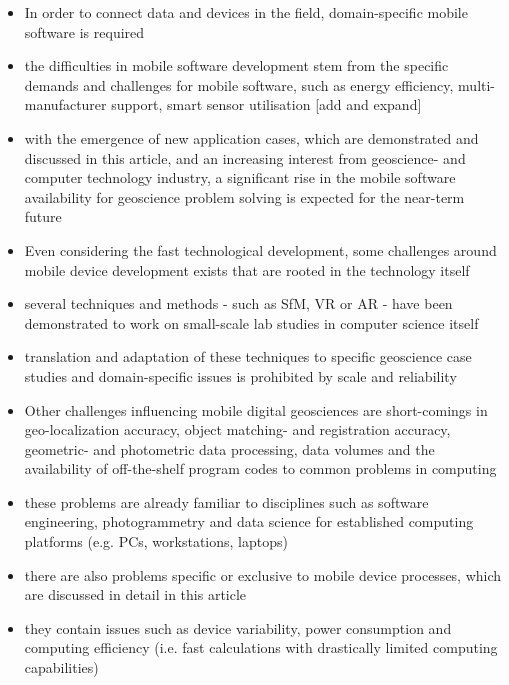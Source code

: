 \documentclass[review]{elsarticle}
\begin{document}
\begin{itemize}
\item In order to connect data and devices in the field, domain-specific mobile software is required
\item the difficulties in mobile software development stem from the specific demands and challenges for mobile software, such as energy efficiency, multi-manufacturer support, smart sensor utilisation [add and expand]
\item with the emergence of new application cases, which are demonstrated and discussed in this article, and an increasing interest from geoscience- and computer technology industry, a significant rise in the mobile software availability for geoscience problem solving is expected for the near-term future
\end{itemize}

\begin{itemize}
\item Even considering the fast technological development, some challenges around mobile device development exists that are rooted in the technology itself
\item several techniques and methods - such as \gls{SfM}, \gls{VR} or \gls{AR} - have been demonstrated to work on small-scale lab studies in computer science itself
\item translation and adaptation of these techniques to specific geoscience case studies and domain-specific issues is prohibited by scale and reliability
\item Other challenges influencing mobile digital geosciences are short-comings in geo-localization accuracy, object matching- and registration accuracy, geometric- and photometric data processing, data volumes and the availability of off-the-shelf program codes to common problems in computing
\item these problems are already familiar to disciplines such as software engineering, photogrammetry and data science for established computing platforms (e.g. PCs, workstations, laptops)
\item there are also problems specific or exclusive to mobile device processes, which are discussed in detail in this article
\item they contain issues such as device variability, power consumption and computing efficiency (i.e. fast calculations with drastically limited computing capabilities)
\end{itemize}
\end{document}
